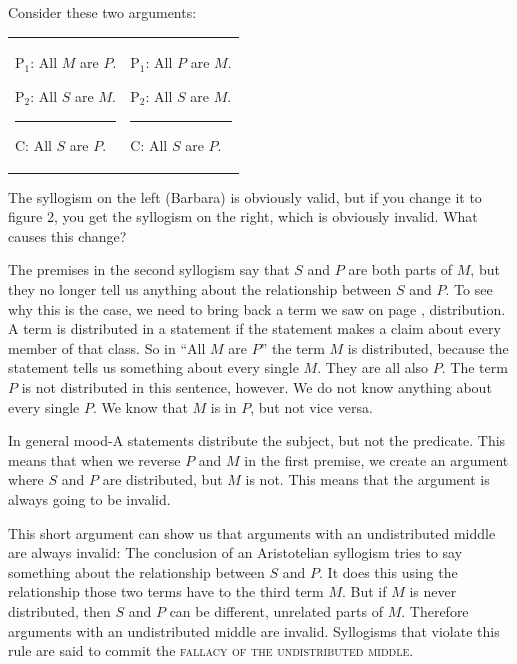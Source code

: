 Consider these two arguments:

\begin{tabu}{p{.5\linewidth}p{.5\linewidth}}

\begin{earg}
\item[P$_1$:] All $M$ are $P$.
\item[P$_2$:] All $S$ are $M$.
\vspace{-.5em}
\item [] \rule{0.4\linewidth}{.5pt} 
\item[C:] All $S$ are $P$.
\end{earg}

&

\begin{earg}
\item[P$_1$:] All $P$ are $M$.
\item[P$_2$:] All $S$ are $M$.
\vspace{-.5em}
\item [] \rule{0.4\linewidth}{.5pt} 
\item[C:] All $S$ are $P$.
\end{earg}

\end{tabu}

The syllogism on the left (Barbara) is obviously valid, but if you change it to figure 2, you get the syllogism on the right, which is obviously invalid. What causes this change?


The premises in the second syllogism say that $S$ and $P$ are both parts of $M$, but they no longer tell us anything about the relationship between $S$ and $P$. To see why this is the case, we need to bring back a term we saw on page \pageref{def:Distribution}, distribution. A term is distributed in a statement if the statement makes a claim about every member of that class. So in ``All $M$ are $P$'' the term $M$ is distributed, because the statement tells us something about every single $M$. They are all also $P$. The term $P$ is not distributed in this sentence, however. We do not know anything about every single $P$. We know that $M$ is in $P$, but not vice versa. 

In general mood-A statements distribute the subject, but not the predicate. This means that when we reverse $P$ and $M$ in the first premise, we create an argument where $S$ and $P$ are distributed, but $M$ is not. This means that the argument is always going to be invalid. 

This short argument can show us that arguments with an undistributed middle are always invalid: The conclusion of an Aristotelian syllogism tries to say something about the relationship between $S$ and $P$. It does this using the relationship those two terms have to the third term $M$. But if $M$ is never distributed, then $S$ and $P$ can be different, unrelated parts of $M$. Therefore arguments with an undistributed middle are invalid. Syllogisms that violate this rule are said to commit the \textsc{\gls{fallacy of the undistributed middle}}. \label{def:undistributed_middle}

